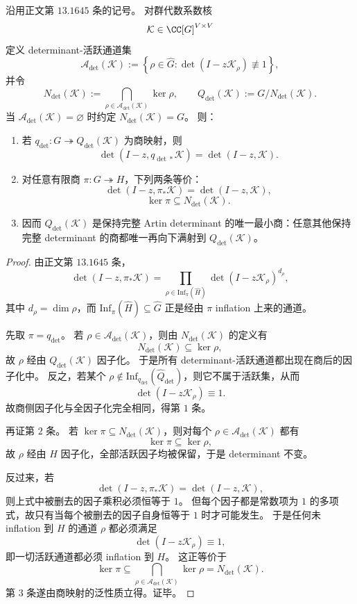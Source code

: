 \begin{theorem}\label{thm:conclusion-artin-determinant-minimal-visible-quotient}
沿用正文第 \(13.1645\) 条的记号。
对群代数系数核
\[
\mathcal K\in \CC[G]^{V\times V}
\]
定义 determinant-活跃通道集
\[
\mathcal A_{\det}(\mathcal K)
:=
\left\{
\rho\in\widehat G:
\det(I-z\mathcal K_\rho)\not\equiv 1
\right\},
\]
并令
\[
N_{\det}(\mathcal K)
:=
\bigcap_{\rho\in\mathcal A_{\det}(\mathcal K)}\ker\rho,
\qquad
Q_{\det}(\mathcal K):=G/N_{\det}(\mathcal K).
\]
当 \(\mathcal A_{\det}(\mathcal K)=\varnothing\) 时约定 \(N_{\det}(\mathcal K)=G\)。
则：
\begin{enumerate}
  \item 若 \(q_{\det}:G\twoheadrightarrow Q_{\det}(\mathcal K)\) 为商映射，则
  \[
  \det(I-z,q_{\det\ast}\mathcal K)=\det(I-z,\mathcal K).
  \]
  \item 对任意有限商 \(\pi:G\twoheadrightarrow H\)，下列两条等价：
  \[
  \det(I-z,\pi_\ast\mathcal K)=\det(I-z,\mathcal K),
  \]
  \[
  \ker\pi\subseteq N_{\det}(\mathcal K).
  \]
  \item 因而 \(Q_{\det}(\mathcal K)\) 是保持完整 Artin determinant 的唯一最小商：任意其他保持完整 determinant 的商都唯一再向下满射到 \(Q_{\det}(\mathcal K)\)。
\end{enumerate}
\end{theorem}

\begin{proof}
由正文第 \(13.1645\) 条，
\[
\det(I-z,\pi_\ast\mathcal K)
=
\prod_{\rho\in \mathrm{Inf}_\pi(\widehat H)}
\det(I-z\mathcal K_\rho)^{d_\rho},
\]
其中 \(d_\rho=\dim\rho\)，而 \(\mathrm{Inf}_\pi(\widehat H)\subseteq\widehat G\) 正是经由 \(\pi\) inflation 上来的通道。

先取 \(\pi=q_{\det}\)。
若 \(\rho\in\mathcal A_{\det}(\mathcal K)\)，则由 \(N_{\det}(\mathcal K)\) 的定义有
\[
N_{\det}(\mathcal K)\subseteq \ker\rho,
\]
故 \(\rho\) 经由 \(Q_{\det}(\mathcal K)\) 因子化。
于是所有 determinant-活跃通道都出现在商后的因子化中。
反之，若某个 \(\rho\notin \mathrm{Inf}_{q_{\det}}(\widehat Q_{\det})\)，则它不属于活跃集，从而
\[
\det(I-z\mathcal K_\rho)\equiv 1.
\]
故商侧因子化与全因子化完全相同，得第 \(1\) 条。

再证第 \(2\) 条。
若 \(\ker\pi\subseteq N_{\det}(\mathcal K)\)，则对每个 \(\rho\in\mathcal A_{\det}(\mathcal K)\) 都有
\[
\ker\pi\subseteq \ker\rho,
\]
故 \(\rho\) 经由 \(H\) 因子化，全部活跃因子均被保留，于是 determinant 不变。

反过来，若
\[
\det(I-z,\pi_\ast\mathcal K)=\det(I-z,\mathcal K),
\]
则上式中被删去的因子乘积必须恒等于 \(1\)。
但每个因子都是常数项为 \(1\) 的多项式，故只有当每个被删去的因子自身恒等于 \(1\) 时才可能发生。
于是任何未 inflation 到 \(H\) 的通道 \(\rho\) 都必须满足
\[
\det(I-z\mathcal K_\rho)\equiv 1,
\]
即一切活跃通道都必须 inflation 到 \(H\)。
这正等价于
\[
\ker\pi
\subseteq
\bigcap_{\rho\in\mathcal A_{\det}(\mathcal K)}\ker\rho
=
N_{\det}(\mathcal K).
\]
第 \(3\) 条遂由商映射的泛性质立得。证毕。
\end{proof}

